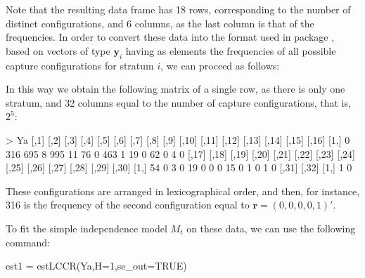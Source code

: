 Note that the resulting data frame has 18 rows, corresponding to the number of distinct configurations, and 6 columns, as the last column is that of the frequencies.
In order to convert these data into the format used in package , based on vectors of type $\bm{y}_i$ having as elements the frequencies of all possible capture configurations for stratum $i$, we can proceed as follows:


In this way we obtain the following matrix of a single row, as there is only one stratum, and 32 columns equal to the number of capture configurations, that is, $2^5$:
\begin{example*}
> Ya
     [,1] [,2] [,3] [,4] [,5] [,6] [,7] [,8] [,9] [,10] [,11] [,12] [,13] [,14] [,15] [,16]
[1,]    0  316  695    8  995   11   76    0  463     1    19     0    62     0     4     0
     [,17] [,18] [,19] [,20] [,21] [,22] [,23] [,24] [,25] [,26] [,27] [,28] [,29] [,30]
[1,]    54     0     3     0    19     0     0     0    15     0     1     0     1     0
     [,31] [,32]
[1,]     1     0
\end{example*}

\noindent These configurations are arranged in lexicographical order, and then, for instance, 316 is the frequency of the second configuration equal to $=(0,0,0,0,1)'$.

To fit the simple independence model $M_t$ on these data, we can use the following command:
\begin{example*}
est1 = estLCCR(Ya,H=1,se_out=TRUE)
\end{example*}

